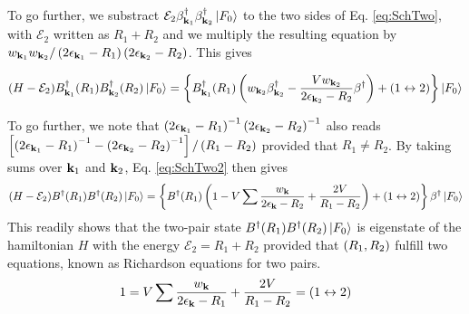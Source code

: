 \documentclass[aps,prb,amsmath,amssymb,preprint,superscriptaddress]{revtex4-1}
\newcommand{\fo}{\ensuremath{\ket{F_0}}}
\renewcommand{\E}{\ensuremath{\mathcal{E}}}
\begin{document}
To go further, we substract $\E_2\beta^{\dagger}_{\vk_1}\beta^{\dagger}_{\vk_2}\fo$ to the two sides of Eq. \eqref{eq:SchTwo}, with $\E_2$ written as $R_1+R_2$ and we multiply the resulting equation by 
$w_{\mathbf{k}_1}w_{\mathbf{k}_2}/\left(2\epsilon_{\mathbf{k}_1}-R_1\right)\left(2\epsilon_{\mathbf{k}_2}-R_2\right)$. This gives 

\begin{equation}\label{eq:SchTwo2}
(H-\E_2)B^{\dagger}_{\vk_1}(R_1)B^{\dagger}_{\vk_2}(R_2)\fo
=\bbr{B^{\dagger}_{\vk_1}(R_1)\br{w_{\vk_2}\beta^{\dagger}_{\vk_2}-\frac{Vw_{\vk_2}}{2\epsilon_{\vk_2}-R_2}\beta^{\dagger}}+(1\leftrightarrow2)}\fo
\end{equation}

To go further, we note that $\left(2\epsilon_{\mathbf{k}_1}-R_1\right)^{-1}\left(2\epsilon_{\mathbf{k}_2}-R_2\right)^{-1}$ also reads  $\left[\left(2\epsilon_{\mathbf{k}_1}-R_1\right)^{-1}-\left(2\epsilon_{\mathbf{k}_2}-R_2\right)^{-1}\right]/\left(R_1-R_2\right)$ provided that $R_1\neq{}R_2$. By taking sums over $\mathbf{k}_1$ and $\mathbf{k}_2$, Eq. \eqref{eq:SchTwo2} then gives
\begin{equation}\label{eq:SchTwo3}
(H-\E_2)B^{\dagger}(R_1)B^{\dagger}(R_2)\fo
=\bbr{B^{\dagger}(R_1)\br{1-V\sum\frac{w_{\vk}}{2\epsilon_{\vk}-R_2}+\frac{2V}{R_1-R_2}}+(1\leftrightarrow2)}\beta^{\dagger}\fo
\end{equation}
This readily shows that the two-pair state $B^{\dagger}(R_1)B^{\dagger}(R_2)\fo$ is eigenstate of the hamiltonian $H$ with the energy $\E_2=R_1+R_2$ provided that $\left(R_1,R_2\right)$ fulfill two equations, known as Richardson equations for two pairs.
\begin{equation}
1=V\sum\frac{w_{\mathbf{k}}}{2\epsilon_{\mathbf{k}}-R_1}+\frac{2V}{R_1-R_2}=(1\leftrightarrow2)
\end{equation}
\end{document}
